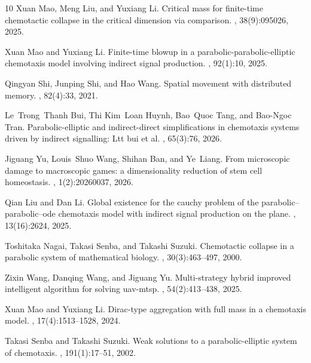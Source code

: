 \documentclass[pdflatex,sn-mathphys-num]{sn-jnl}%
\theoremstyle{thmstyleone}
\theoremstyle{thmstyletwo}
\theoremstyle{thmstylethree}
\begin{document}
\begin{thebibliography}{10}
Xuan Mao, Meng Liu, and Yuxiang Li.
\newblock Critical mass for finite-time chemotactic collapse in the critical dimension via comparison.
, 38(9):095026, 2025.

Xuan Mao and Yuxiang Li.
\newblock Finite-time blowup in a parabolic-parabolic-elliptic chemotaxis model involving indirect signal production.
, 92(1):10, 2025.

Qingyan Shi, Junping Shi, and Hao Wang.
\newblock Spatial movement with distributed memory.
, 82(4):33, 2021.

Le~Trong~Thanh Bui, Thi Kim~Loan Huynh, Bao~Quoc Tang, and Bao-Ngoc Tran.
\newblock Parabolic-elliptic and indirect-direct simplifications in chemotaxis systems driven by indirect signalling: Ltt bui et al.
, 65(3):76, 2026.

Jiguang Yu, Louis~Shuo Wang, Shihan Ban, and Ye~Liang.
\newblock From microscopic damage to macroscopic games: a dimensionality reduction of stem cell homeostasis.
, 1(2):20260037, 2026.

Qian Liu and Dan Li.
\newblock Global existence for the cauchy problem of the parabolic--parabolic--ode chemotaxis model with indirect signal production on the plane.
, 13(16):2624, 2025.

Toshitaka Nagai, Takasi Senba, and Takashi Suzuki.
\newblock Chemotactic collapse in a parabolic system of mathematical biology.
, 30(3):463--497, 2000.

Zixin Wang, Danqing Wang, and Jiguang Yu.
\newblock Multi-strategy hybrid improved intelligent algorithm for solving uav-mtsp.
, 54(2):413--438, 2025.

Xuan Mao and Yuxiang Li.
\newblock Dirac-type aggregation with full mass in a chemotaxis model.
, 17(4):1513--1528, 2024.

Takasi Senba and Takashi Suzuki.
\newblock Weak solutions to a parabolic-elliptic system of chemotaxis.
, 191(1):17--51, 2002.


\end{thebibliography}
\end{document}
